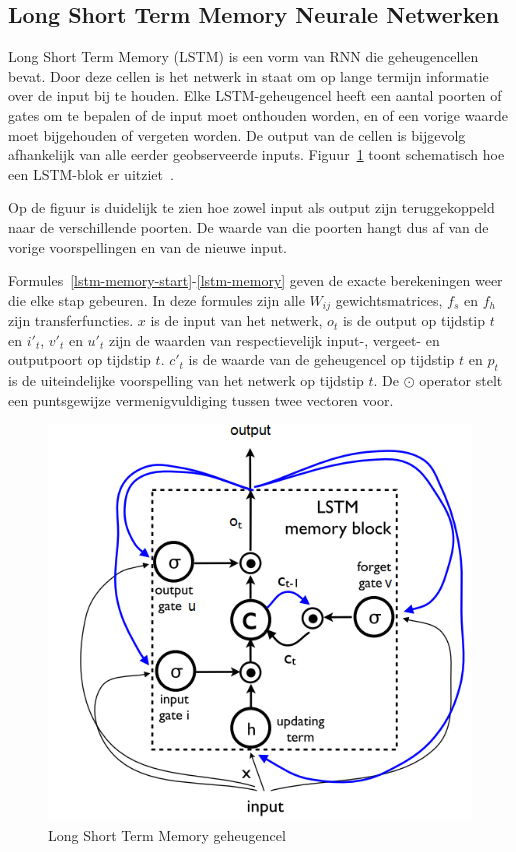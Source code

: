 \subsection{Long Short Term Memory Neurale Netwerken}
\label{sub:lstm}
Long Short Term Memory (LSTM) is een vorm van RNN die geheugencellen bevat. Door deze cellen is het netwerk in staat om op lange termijn informatie over de input bij te houden. Elke LSTM-geheugencel heeft een aantal poorten of gates om te bepalen of de input moet onthouden worden, en of een vorige waarde moet bijgehouden of vergeten worden. De output van de cellen is bijgevolg afhankelijk van alle eerder geobserveerde inputs. Figuur~\ref{fig:lstm} toont schematisch hoe een LSTM-blok er uitziet~\cite{SeppHochreiter1997,Google}.

Op de figuur is duidelijk te zien hoe zowel input als output zijn teruggekoppeld naar de verschillende poorten. De waarde van die poorten hangt dus af van de vorige voorspellingen en van de nieuwe input.

Formules~\eqref{lstm-memory-start}-\eqref{lstm-memory} geven de exacte berekeningen weer die elke stap gebeuren. In deze formules zijn alle $W_{ij}$ gewichtsmatrices, $f_s$ en $f_h$ zijn transferfuncties. $x$ is de input van het netwerk, $o_t$ is de output op tijdstip $t$ en $i'_t$, $v'_t$ en $u'_t$ zijn de waarden van respectievelijk input-, vergeet- en outputpoort op tijdstip $t$. $c'_t$ is de waarde van de geheugencel op tijdstip $t$ en $p_t$ is de uiteindelijke voorspelling van het netwerk op tijdstip $t$. De $\odot$ operator stelt een puntsgewijze vermenigvuldiging tussen twee vectoren voor.


\begin{figure}[tb]
    \centering
    \includegraphics[width=\linewidth]{Images/lstm.PNG}
    \caption[Long Short Term Memory geheugencel]{Long Short Term Memory geheugencel~\cite{Google}}
    \label{fig:lstm}
\end{figure}

